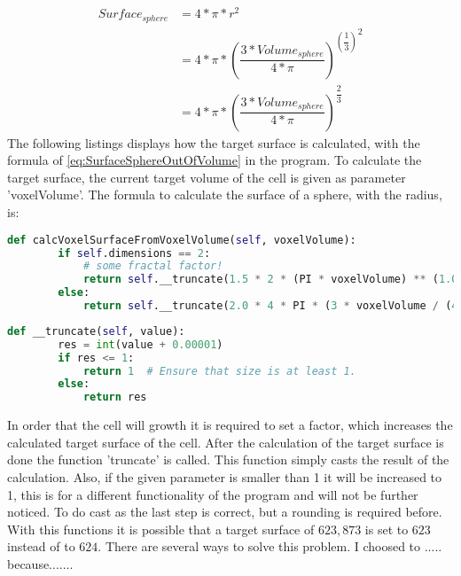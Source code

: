 \begin{equation}\label{eq:SurfaceSphereOutOfVolume}
\begin{split}
Surface_{sphere} &= 4*\pi*r^{2} \\ 
				 &= 4*\pi*{(\dfrac{3*Volume_{sphere}}{4*\pi})^{(\dfrac{1}{3})}}^{2} \\
				 &= 4*\pi*(\dfrac{3*Volume_{sphere}}{4*\pi})^{\dfrac{2}{3}}
\end{split}
\end{equation}
The following listings displays how the target surface is calculated, with the formula of \ref{eq:SurfaceSphereOutOfVolume} in the program.
To calculate the target surface, the current target volume of the cell is given as parameter 'voxelVolume'. The formula to calculate the surface of a sphere, with the radius, is: 
\begin{lstlisting}[language=Python, caption= calculation of the target surface of a cell]
    def calcVoxelSurfaceFromVoxelVolume(self, voxelVolume):
        if self.dimensions == 2:
            # some fractal factor!
            return self.__truncate(1.5 * 2 * (PI * voxelVolume) ** (1.0 / 2.0))  # Circumference.
        else:
			return self.__truncate(2.0 * 4 * PI * (3 * voxelVolume / (4 * PI)) ** (2.0 / 3.0)) # Surface.
\end{lstlisting}
\begin{lstlisting}[language=Python, caption= calculation of the target surface of a cell]
    def __truncate(self, value):
        res = int(value + 0.00001)
        if res <= 1:
            return 1  # Ensure that size is at least 1.
        else:
			return res
\end{lstlisting}

In order that the cell will growth it is required to set a factor, which increases the calculated target surface of the cell. After the calculation of the target surface is done the function 'truncate' is called. This function simply casts the result of the calculation. Also, if the given parameter is smaller than 1 it will be increased to 1, this is for a different functionality of the program and will not be further noticed. To do cast as the last step is correct, but a rounding is required before. With this functions it is possible that a target surface of $623,873$ is set to $623$ instead of to $624$. There are several ways to solve this problem. I choosed to ..... because.......





